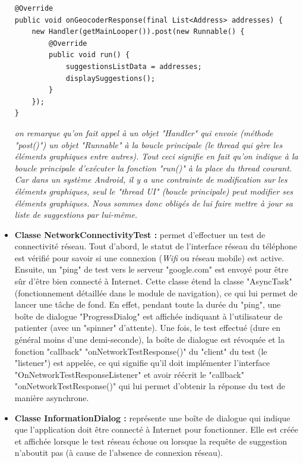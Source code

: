 \begin{itemize}
\begin{lstlisting}
@Override
public void onGeocoderResponse(final List<Address> addresses) {
    new Handler(getMainLooper()).post(new Runnable() {
        @Override
        public void run() {
            suggestionsListData = addresses;
            displaySuggestions();
        }
    });
}
\end{lstlisting}

{\it on remarque qu'on fait appel à un objet "Handler" qui envoie (méthode "post()") un objet "Runnable" à la boucle principale (le thread qui gère les éléments graphiques entre autres). Tout ceci signifie en fait qu'on indique à la boucle principale d'exécuter la fonction "run()" à la place du thread courant. Car dans un système Android, il y a une contrainte de modification sur les éléments graphiques, seul le "thread UI" (boucle principale) peut modifier ses éléments graphiques. Nous sommes donc obligés de lui faire mettre à jour sa liste de suggestions par lui-même.}\\

\item \textbf{Classe NetworkConnectivityTest :} permet d'effectuer un test de connectivité réseau. Tout d'abord, le statut de l'interface réseau du téléphone est vérifié pour savoir si une connexion (\textit{Wifi} ou réseau mobile) est active. Ensuite, un "ping" de test vers le serveur "google.com" est envoyé pour être sûr d'être bien connecté à Internet. Cette classe étend la classe "AsyncTask" (fonctionnement détaillée dans le module de navigation), ce qui lui permet de lancer une tâche de fond. En effet, pendant toute la durée du "ping", une boîte de dialogue "ProgressDialog" est affichée indiquant à l'utilisateur de patienter (avec un "spinner" d'attente). Une fois, le test effectué (dure en général moins d'une demi-seconde), la boîte de dialogue est révoquée et la fonction "callback" "onNetworkTestResponse()" du "client" du test (le "listener") est appelée, ce qui signifie qu'il doit implémenter l'interface "OnNetworkTestResponseListener" et avoir réécrit le "callback" "onNetworkTestResponse()" qui lui permet d'obtenir la réponse du test de manière asynchrone.\\

\item \textbf{Classe InformationDialog :} représente une boîte de dialogue qui indique que l'application doit être connecté à Internet pour fonctionner. Elle est créée et affichée lorsque le test réseau échoue ou lorsque la requête de suggestion n'aboutit pas (à cause de l'absence de connexion réseau).\\
\end{itemize}

